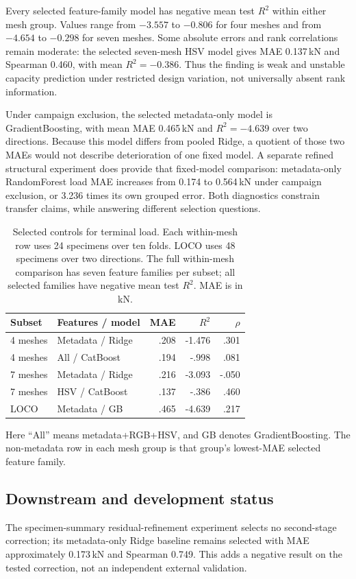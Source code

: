 \documentclass[conference]{IEEEtran}
\begin{document}
Every selected feature-family model has negative mean test $R^2$ within either mesh group. Values range from $-3.557$ to $-0.806$ for four meshes and from $-4.654$ to $-0.298$ for seven meshes. Some absolute errors and rank correlations remain moderate: the selected seven-mesh HSV model gives MAE 0.137\,kN and Spearman 0.460, with mean $R^2=-0.386$. Thus the finding is weak and unstable capacity prediction under restricted design variation, not universally absent rank information.

Under campaign exclusion, the selected metadata-only model is GradientBoosting, with mean MAE 0.465\,kN and $R^2=-4.639$ over two directions. Because this model differs from pooled Ridge, a quotient of those two MAEs would not describe deterioration of one fixed model. A separate refined structural experiment does provide that fixed-model comparison: metadata-only RandomForest load MAE increases from 0.174 to 0.564\,kN under campaign exclusion, or 3.236 times its own grouped error. Both diagnostics constrain transfer claims, while answering different selection questions.


\begin{table}[t]\centering
\caption{Selected controls for terminal load. Each within-mesh row uses 24 specimens over ten folds. LOCO uses 48 specimens over two directions. The full within-mesh comparison has seven feature families per subset; all selected families have negative mean test $R^2$. MAE is in kN.}\label{tab:controls}
\footnotesize
\begin{tabular}{llrrr}\toprule
Subset & Features / model & MAE & $R^2$ & $\rho$\\\midrule
4 meshes & Metadata / Ridge & .208 & -1.476 & .301\\
4 meshes & All / CatBoost & .194 & -.998 & .081\\
7 meshes & Metadata / Ridge & .216 & -3.093 & -.050\\
7 meshes & HSV / CatBoost & .137 & -.386 & .460\\
LOCO & Metadata / GB & .465 & -4.639 & .217\\\bottomrule
\end{tabular}
\end{table}
Here ``All'' means metadata+RGB+HSV, and GB denotes GradientBoosting. The non-metadata row in each mesh group is that group's lowest-MAE selected feature family.

\subsection{Downstream and development status}
The specimen-summary residual-refinement experiment selects no second-stage correction; its metadata-only Ridge baseline remains selected with MAE approximately 0.173\,kN and Spearman 0.749. This adds a negative result on the tested correction, not an independent external validation.
\end{document}
